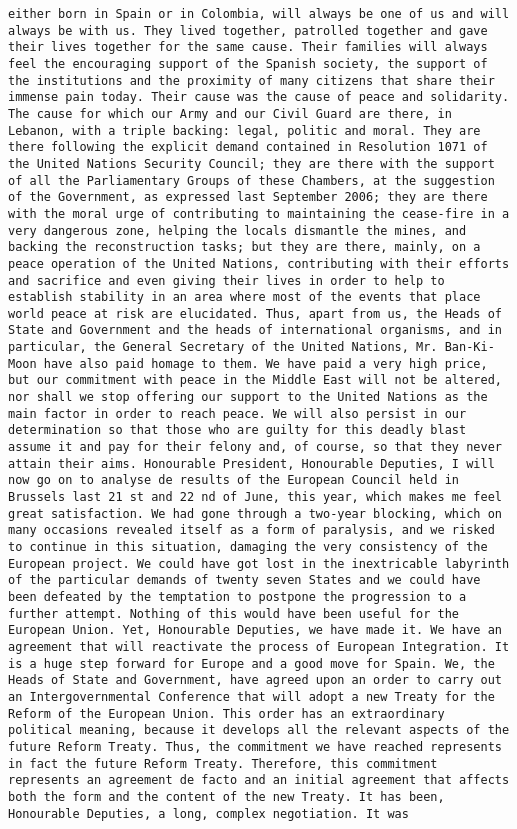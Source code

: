 \documentclass[
]{article}
\begin{document}
\begin{verbatim}
either born in Spain or in Colombia, will always be one of us and will always be with us. They lived together, patrolled together and gave their lives together for the same cause. Their families will always feel the encouraging support of the Spanish society, the support of the institutions and the proximity of many citizens that share their immense pain today. Their cause was the cause of peace and solidarity. The cause for which our Army and our Civil Guard are there, in Lebanon, with a triple backing: legal, politic and moral. They are there following the explicit demand contained in Resolution 1071 of the United Nations Security Council; they are there with the support of all the Parliamentary Groups of these Chambers, at the suggestion of the Government, as expressed last September 2006; they are there with the moral urge of contributing to maintaining the cease-fire in a very dangerous zone, helping the locals dismantle the mines, and backing the reconstruction tasks; but they are there, mainly, on a peace operation of the United Nations, contributing with their efforts and sacrifice and even giving their lives in order to help to establish stability in an area where most of the events that place world peace at risk are elucidated. Thus, apart from us, the Heads of State and Government and the heads of international organisms, and in particular, the General Secretary of the United Nations, Mr. Ban-Ki-Moon have also paid homage to them. We have paid a very high price, but our commitment with peace in the Middle East will not be altered, nor shall we stop offering our support to the United Nations as the main factor in order to reach peace. We will also persist in our determination so that those who are guilty for this deadly blast assume it and pay for their felony and, of course, so that they never attain their aims. Honourable President, Honourable Deputies, I will now go on to analyse de results of the European Council held in Brussels last 21 st and 22 nd of June, this year, which makes me feel great satisfaction. We had gone through a two-year blocking, which on many occasions revealed itself as a form of paralysis, and we risked to continue in this situation, damaging the very consistency of the European project. We could have got lost in the inextricable labyrinth of the particular demands of twenty seven States and we could have been defeated by the temptation to postpone the progression to a further attempt. Nothing of this would have been useful for the European Union. Yet, Honourable Deputies, we have made it. We have an agreement that will reactivate the process of European Integration. It is a huge step forward for Europe and a good move for Spain. We, the Heads of State and Government, have agreed upon an order to carry out an Intergovernmental Conference that will adopt a new Treaty for the Reform of the European Union. This order has an extraordinary political meaning, because it develops all the relevant aspects of the future Reform Treaty. Thus, the commitment we have reached represents in fact the future Reform Treaty. Therefore, this commitment represents an agreement de facto and an initial agreement that affects both the form and the content of the new Treaty. It has been, Honourable Deputies, a long, complex negotiation. It was 
\end{verbatim}
\end{document}
